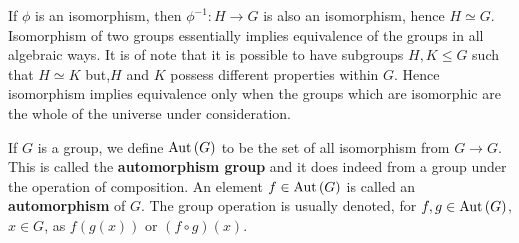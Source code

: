 \newpage
\begin{remark}
	If $\phi$ is an isomorphism, then $\phi ^{-1} : H \to G$ is also an isomorphism, hence $H \simeq G$. Isomorphism of two groups essentially implies equivalence of the groups in all algebraic ways. It is of note that it is possible to have subgroups $H, K \le G$ such that $H \simeq K$ but,$H$ and $K$ possess different properties within $G$. Hence isomorphism implies equivalence only when the groups which are isomorphic are the whole of the universe under consideration.
\end{remark}
\begin{definition}[Automorphism]
	If $G$ is a group, we define $\operatorname{Aut} \left( G \right) $ to be the set of all isomorphism from $G \to G$. This is called the \textbf{automorphism group} and it does indeed from a group under the operation  of composition. An element $f \in \operatorname{Aut}\left( G \right) $ is called an \textbf{automorphism} of $G$. The group operation is usually denoted, for $f, g \in \operatorname{Aut} \left( G \right) $, $x\in G$, as $f\left( g\left( x \right)  \right) $ or $\left(f \circ g \right) \left( x \right) $.
\end{definition}
